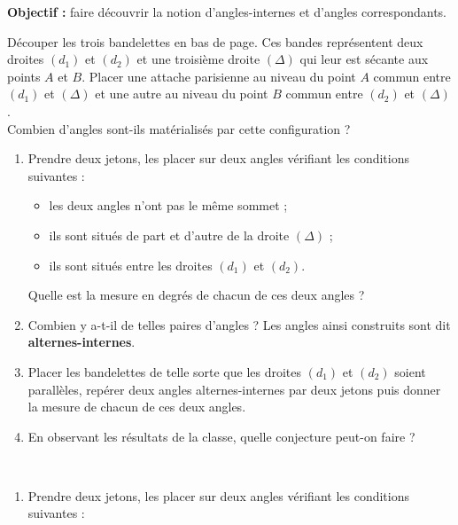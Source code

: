 \activites

\begin{activite}
   {\bf Objectif :} faire découvrir la notion d'angles-internes et d'angles correspondants.
   {\renewcommand{\baselinestretch}{1.15}\selectfont
   \begin{QCM}
   \partie[préparation]
      Découper les trois bandelettes en bas de page. Ces bandes représentent deux droites $(d_1)$ et $(d_2)$ et une troisième droite $(\Delta)$ qui leur est sécante aux points $A$ et $B$. Placer une attache parisienne au niveau du point $A$ commun entre $(d_1)$ et $(\Delta)$ et une autre au niveau du point $B$ commun entre $(d_2)$ et $(\Delta)$. \\
      Combien d'angles sont-ils matérialisés par cette configuration ?
   \ \\ [-11mm]
      \begin{enumerate}
         \item Prendre deux jetons, les placer sur deux angles vérifiant les conditions suivantes :
            \begin{itemize}
               \item les deux angles n'ont pas le même sommet ;
               \item ils sont situés de part et d'autre de la droite $(\Delta)$ ;
               \item ils sont situés \og entre \fg{} les droites $(d_1)$ et $(d_2)$.
            \end{itemize}
         Quelle est la mesure en degrés de chacun de ces deux angles ?
         \item Combien y a-t-il de telles paires d'angles ?
         Les angles ainsi construits sont dit {\bf alternes-internes}.
         \item Placer les bandelettes de telle sorte que les droites $(d_1)$ et $(d_2)$ soient parallèles, repérer deux angles alternes-internes par deux jetons puis donner la mesure de chacun de ces deux angles.
         \item En observant les résultats de la classe, quelle conjecture peut-on faire ?
      \end{enumerate}
    \ \\ [-11mm]
      \begin{enumerate}
         \item Prendre deux jetons, les placer sur deux angles vérifiant les conditions suivantes :

\end{enumerate}
\end{QCM}}
\end{activite}
